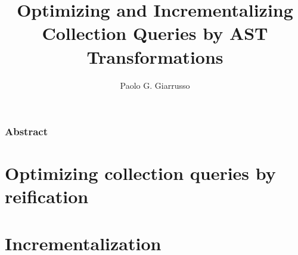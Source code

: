 \documentclass{book}
\title{Optimizing and Incrementalizing Collection Queries by AST Transformations}
\author{Paolo G. Giarrusso}
\begin{document}
\maketitle


\section*{Abstract}

\tableofcontents

\listoffigures
\listoftables



\part{Optimizing collection queries by reification}
\label{sec:ch-aosd13}





\part{Incrementalization}
\label{part:incr}





%
%

%

%



% 
% 

\begin{oldSec}

\end{oldSec}

\begin{oldSec}

\end{oldSec}




\end{document}
